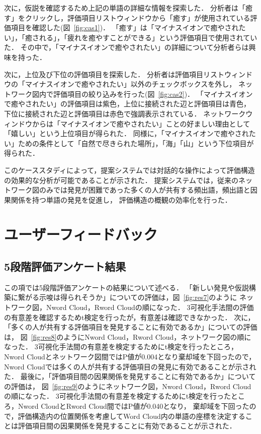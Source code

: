 \documentclass[syuuron]{kuee}
\begin{document}
	次に，仮説を確認するため上記の単語の詳細な情報を探索した．
	分析者は「癒す」をクリックし，評価項目リストウィンドウから「癒す」が使用されている評価項目を確認した(図~\ref{fig:cas1})．
	「癒す」は「マイナスイオンで癒やされたい」，「癒される」，「疲れを癒やすことができる」という評価項目で使用されていた．
	その中で，「マイナスイオンで癒やされたい」の詳細について分析者らは興味を持った．
	
	次に，上位及び下位の評価項目を探索した．
	分析者は評価項目リストウィンドウの「マイナスイオンで癒やされたい」以外のチェックボックスを外し，
	ネットワーク図内で評価項目の絞り込みを行った(図~\ref{fig:cas2})．
	「マイナスイオンで癒やされたい」の評価項目は紫色，上位に接続された辺と評価項目は青色，
	下位に接続された辺と評価項目は赤色で強調表示されている．
	ネットワークウィンドウからは「マイナスイオンで癒やされたい」ことの好ましい理由として「嬉しい」という上位項目が得られた．
	同様に，「マイナスイオンで癒やされたい」ための条件として「自然で尽きられた場所」，「海」「山」という下位項目が得られた．
	
	このケーススタディによって，提案システムでは対話的な操作によって評価構造の効果的な分析が可能であることが示された．
	提案システムでは，従来のネットワーク図のみでは発見が困難であった多くの人が共有する頻出語，頻出語と因果関係を持つ単語の発見を促進し，
	評価構造の概観の効率化を行った．
	
	\section{ユーザーフィードバック}
		\subsection{5段階評価アンケート結果}
		この項では5段階評価アンケートの結果について述べる．
		「新しい発見や仮説構築に繋がる示唆は得られそうか」についての評価は，図~\ref{fig:res7}のように
		ネットワーク図，Nword Cloud，Rword Cloudの順になった．
		3可視化手法間の評価の有意差を確認するためt検定を行ったが，有意差は確認できなかった．
		次に，「多くの人が共有する評価項目を発見することに有効であるか」についての評価は，
		図~\ref{fig:res8}のようにNword Cloud，Rword Cloud，ネットワーク図の順になった．
		3可視化手法間の有意差を検定するためにt検定を行ったところ，Nword Cloudとネットワーク図間ではP値が0.004となり棄却域を下回ったので，
		Nword Cloudでは多くの人が共有する評価項目の発見に有効であることが示された．
		最後に，「評価項目間の因果関係を発見することに有効であるか」についての評価は，
		図~\ref{fig:res9}のようにネットワーク図，Nword Cloud，Rword Cloudの順になった．
		3可視化手法間の有意差を検定するためにt検定を行ったところ，Nword CloudとRword Cloud間ではP値が0.040となり，
		棄却域を下回ったので，評価構造内の位置関係を考慮してWord Cloud内の単語の座標を決定することは評価項目間の因果関係を発見することに有効であることが示された．
	
\end{document}
